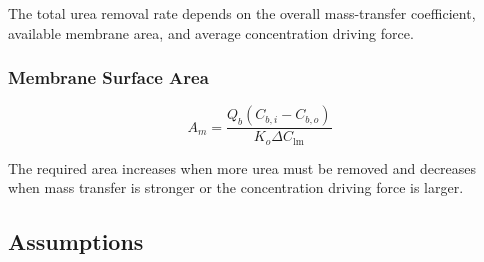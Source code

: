 \documentclass[10.5pt]{article}
\begin{document}
The total urea removal rate depends on the overall mass-transfer coefficient,
available membrane area, and average concentration driving force.

   
\subsubsection{Membrane Surface Area}

\vspace{0.1cm}

\begin{equation}
    A_m =
    \frac{Q_b(C_{b,i}-C_{b,o})}
    {K_o\Delta C_{\text{lm}}}
\end{equation}

\vspace{-0.35cm}

The required area increases when more urea must be removed and decreases
when mass transfer is stronger or the concentration driving force is larger.

\subsection{Assumptions}
\end{document}
